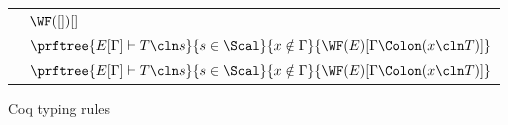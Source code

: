 \begin{figure}
\renewcommand{\arraystretch}{1}
\begin{tabular}{R{0.3\textwidth}L{0.65\textwidth}}
 &
$\WF([])[]$
\\[0.5cm]
 &
$\prftree
{E[\Gamma] \vdash T \cln s}
{s \in \Scal}
{x \notin \Gamma}
{\WF(E)[\Gamma \Colon (x \cln T)]}
$
\\[0.5cm]
 &
$\prftree
{E[\Gamma] \vdash T \cln s}
{s \in \Scal}
{x \notin \Gamma}
{\WF(E)[\Gamma \Colon (x \cln T)]}
$
\end{tabular}
\caption{Coq typing rules}
\label{fig:coq_proof_system}
\renewcommand{\arraystretch}{1}
\end{figure}